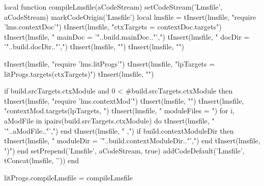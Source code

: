 \startLuaCode
local function compileLmsfile(aCodeStream)
  setCodeStream('Lmsfile', aCodeStream)
  markCodeOrigin('Lmsfile')
  local lmsfile = {}
  tInsert(lmsfile, "require 'lms.contextDoc'\n")
  tInsert(lmsfile, "ctxTargets = contextDoc.targets{")
  tInsert(lmsfile, "  mainDoc  = '"..build.mainDoc.."',")
  tInsert(lmsfile, "  docDir    = '"..build.docDir.."',")
  tInsert(lmsfile, "}")
  tInsert(lmsfile, "")
  
  tInsert(lmsfile, "require 'lms.litProgs'\n")
  tInsert(lmsfile, "lpTargets = litProgs.targets(ctxTargets)")
  tInsert(lmsfile, "")
    
  if build.srcTargets.ctxModule and 0 < #build.srcTargets.ctxModule then
    tInsert(lmsfile, "require 'lms.contextMod'")
    tInsert(lmsfile, "")
    tInsert(lmsfile, "contextMod.targets(lpTargets, {")
      tInsert(lmsfile, "  moduleFiles = {")
      for i, aModFile in ipairs(build.srcTargets.ctxModule) do
        tInsert(lmsfile, "    '"..aModFile.."',")
      end
      tInsert(lmsfile, "  },")
      if build.contextModuleDir then
        tInsert(lmsfile, "  moduleDir = '"..build.contextModuleDir.."',")
      end
    tInsert(lmsfile, "})")
  end
  setPrepend('Lmsfile', aCodeStream, true)
  addCodeDefault('Lmsfile', tConcat(lmsfile, '\n'))
end

litProgs.compileLmsfile = compileLmsfile
\stopLuaCode

\stopchapter
